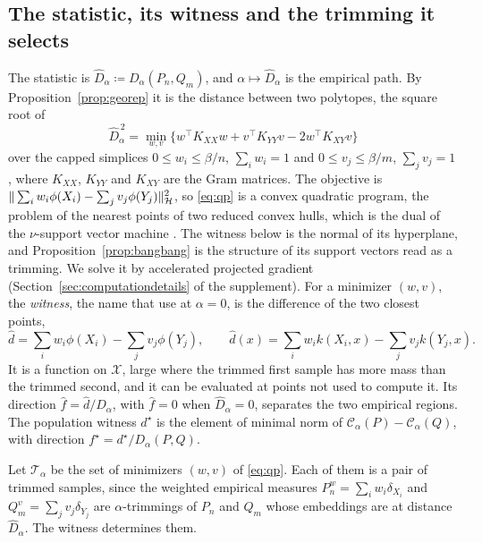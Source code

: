 \subsection{The statistic, its witness and the trimming it selects}
\label{sec:statistic}

The statistic is $\widehat D_\alpha\coloneqq D_\alpha(P_n,Q_m)$, and $\alpha\mapsto\widehat D_\alpha$ is the empirical
path. By Proposition~\ref{prop:georep} it is the distance between two polytopes, the square root of
\begin{equation}
\widehat D_\alpha^{\,2}
=\min_{w,v}\big\{w^\top K_{XX}w+v^\top K_{YY}v-2w^\top K_{XY}v\big\}
\label{eq:qp}
\end{equation}
over the capped simplices $0\le w_i\le\beta/n$, $\sum_iw_i=1$ and $0\le v_j\le\beta/m$, $\sum_jv_j=1$, where $K_{XX}$,
$K_{YY}$ and $K_{XY}$ are the Gram matrices. The objective is $\|\sum_iw_i\phi(X_i)-\sum_jv_j\phi(Y_j)\|_{\mathcal{H}}^2$, so
\eqref{eq:qp} is a convex quadratic program, the problem of the nearest points of two reduced convex hulls, which is the
dual of the $\nu$-support vector machine \citep{bennett2000duality,crisp1999geometric,takeda2008nusvm}. The witness
below is the normal of its hyperplane, and Proposition~\ref{prop:bangbang} is the structure of its support vectors read
as a trimming. We solve it by accelerated projected gradient (Section~\ref{sec:computationdetails} of the supplement). For a minimizer $(w,v)$, the \emph{witness}, the name that \citet{gretton2012kernel} use at $\alpha=0$, is
the difference of the two closest points,
\begin{equation}
\widehat d=\sum_iw_i\phi(X_i)-\sum_jv_j\phi(Y_j),
\qquad
\widehat d(x)=\sum_iw_ik(X_i,x)-\sum_jv_jk(Y_j,x).
\label{eq:witness}
\end{equation}
It is a function on $\mathcal X$, large where the trimmed first sample has more mass than the trimmed second, and it
can be evaluated at points not used to compute it. Its direction $\widehat f=\widehat d/\widehat D_\alpha$, with $\widehat f=0$ when $\widehat D_\alpha=0$,
separates the two empirical regions. The population witness $d^\star$ is the element of minimal norm of
$\mathcal C_\alpha(P)-\mathcal C_\alpha(Q)$, with direction $f^\star=d^\star/D_\alpha(P,Q)$.

Let $\mathcal T_\alpha$ be the set of minimizers $(w,v)$ of \eqref{eq:qp}. Each of them is a pair of trimmed samples,
since the weighted empirical measures $P_n^w=\sum_iw_i\delta_{X_i}$ and $Q_m^v=\sum_jv_j\delta_{Y_j}$ are
$\alpha$-trimmings of $P_n$ and $Q_m$ whose embeddings are at distance $\widehat D_\alpha$. The witness determines
them.

